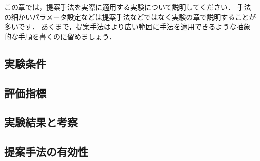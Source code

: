この章では，提案手法を実際に適用する実験について説明してください．
手法の細かいパラメータ設定などは提案手法などではなく実験の章で説明することが多いです．
あくまで，提案手法はより広い範囲に手法を適用できるような抽象的な手順を書くのに留めましょう．
\subsection{実験条件}

\subsection{評価指標}

\subsection{実験結果と考察}

\subsection{提案手法の有効性}